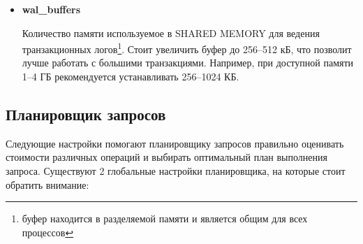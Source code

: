 \begin{itemize}
\item \textbf{wal\_buffers}

Количество памяти используемое в SHARED MEMORY для ведения транзакционных логов\footnote{буфер находится в 
разделяемой памяти и является общим для всех процессов}.
Стоит увеличить буфер до 256--512 кБ, что позволит лучше работать с большими транзакциями.
Например, при доступной памяти 1--4 ГБ рекомендуется устанавливать 256--1024 КБ.

\end{itemize}


\subsection{Планировщик запросов}
Следующие настройки помогают планировщику запросов правильно оценивать стоимости различных 
операций и выбирать оптимальный план выполнения запроса. Существуют 2 глобальные настройки планировщика, 
на которые стоит обратить внимание:
